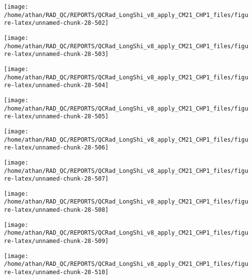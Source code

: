 \documentclass[
  10pt,
  a4paper,oneside]{article}
\begin{document}
\begin{center}\texttt{[image: /home/athan/RAD\_QC/REPORTS/QCRad\_LongShi\_v8\_apply\_CM21\_CHP1\_files/figure-latex/unnamed-chunk-28-502]} \end{center}

\begin{center}\texttt{[image: /home/athan/RAD\_QC/REPORTS/QCRad\_LongShi\_v8\_apply\_CM21\_CHP1\_files/figure-latex/unnamed-chunk-28-503]} \end{center}

\begin{center}\texttt{[image: /home/athan/RAD\_QC/REPORTS/QCRad\_LongShi\_v8\_apply\_CM21\_CHP1\_files/figure-latex/unnamed-chunk-28-504]} \end{center}

\begin{center}\texttt{[image: /home/athan/RAD\_QC/REPORTS/QCRad\_LongShi\_v8\_apply\_CM21\_CHP1\_files/figure-latex/unnamed-chunk-28-505]} \end{center}

\begin{center}\texttt{[image: /home/athan/RAD\_QC/REPORTS/QCRad\_LongShi\_v8\_apply\_CM21\_CHP1\_files/figure-latex/unnamed-chunk-28-506]} \end{center}

\begin{center}\texttt{[image: /home/athan/RAD\_QC/REPORTS/QCRad\_LongShi\_v8\_apply\_CM21\_CHP1\_files/figure-latex/unnamed-chunk-28-507]} \end{center}

\begin{center}\texttt{[image: /home/athan/RAD\_QC/REPORTS/QCRad\_LongShi\_v8\_apply\_CM21\_CHP1\_files/figure-latex/unnamed-chunk-28-508]} \end{center}

\begin{center}\texttt{[image: /home/athan/RAD\_QC/REPORTS/QCRad\_LongShi\_v8\_apply\_CM21\_CHP1\_files/figure-latex/unnamed-chunk-28-509]} \end{center}

\begin{center}\texttt{[image: /home/athan/RAD\_QC/REPORTS/QCRad\_LongShi\_v8\_apply\_CM21\_CHP1\_files/figure-latex/unnamed-chunk-28-510]} \end{center}
\end{document}
